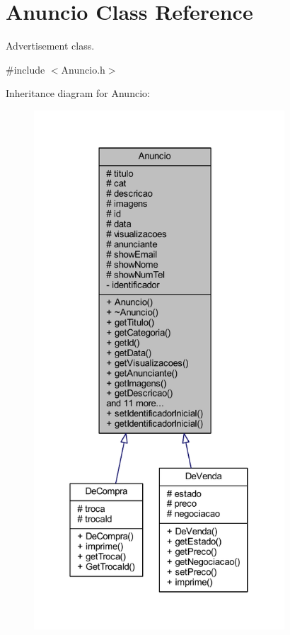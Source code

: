 \hypertarget{class_anuncio}{}\section{Anuncio Class Reference}
\label{class_anuncio}


Advertisement class.  




{\ttfamily \#include $<$Anuncio.\+h$>$}



Inheritance diagram for Anuncio\+:\nopagebreak
\begin{figure}[H]
\begin{center}
\leavevmode
\includegraphics[height=550pt]{class_anuncio__inherit__graph}
\end{center}
\end{figure}


